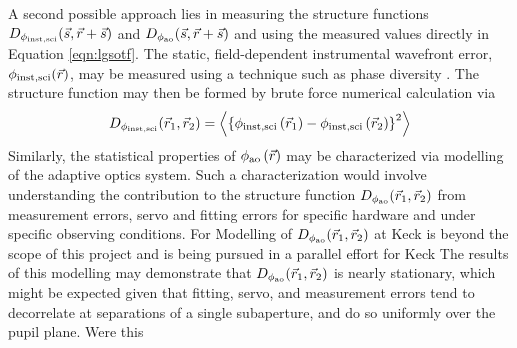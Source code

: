 

A second possible approach lies in measuring the structure functions
$D_{\rm \phi_{inst,sci}}(\vec{s}, \vec{r} +\vec{s} )$ 
and
$D_{\rm \phi_{ao}}(\vec{s}, \vec{r} + \vec{s})$
and using the measured values directly in Equation
\ref{eqn:lgsotf}.  The static, field-dependent instrumental wavefront
error, $\phi_{\rm inst,sci}(\vec{r})$, may be measured using a technique 
such as phase diversity \cite{Fitzgerald:2014,Sitarski:2014}.  The
structure function may then be formed by brute force numerical
calculation via
\begin{equation}
\label{eqn:strfn_inst}
D_{\rm \phi_{inst,sci}}(\vec{r}_{1}, \vec{r}_{2})  = 
\left\langle \left\{\phi_{\rm inst,sci}\left(\vec{r}_{1}\right) - 
\phi_{\rm inst,sci}\left(\vec{r}_{2}\right)\right\}^{2}\right\rangle
\end{equation}
Similarly, the statistical properties of $\phi_{\rm
  ao}\left(\vec{r}\right)$ may be characterized via modelling
of the adaptive optics system.  Such a characterization would involve
understanding the contribution to the structure function $D_{\rm
  \phi_{ao}}(\vec{r}_{1},\vec{r}_{2})$ from measurement errors,
servo and fitting errors for specific hardware and under specific
observing conditions.  For %
Modelling of $D_{\rm \phi_{ao}}(\vec{r}_{1},\vec{r}_{2})$ at Keck is beyond 
the scope of this project and is being pursued in a parallel effort
for Keck \cite{Jolissaint:2014,Ragland:2016}
The results of this modelling may demonstrate that 
$D_{\rm \phi_{ao}}(\vec{r}_{1},\vec{r}_{2})$ is nearly
stationary, which might be expected given that fitting,
servo, and measurement errors tend to decorrelate at separations of a
single subaperture, and do so uniformly over the pupil plane.  Were this
